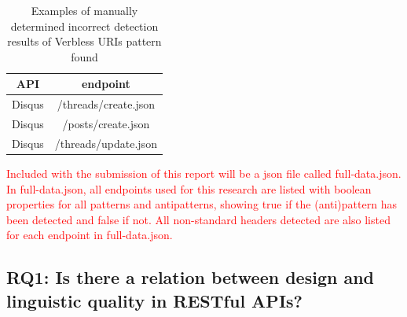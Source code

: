 \begin{table}[]
    \centering
    \begin{tabular}{|c|c|} \hline
        API & endpoint \\ \hline
        Disqus & /threads/create.json \\ \hline
        Disqus & /posts/create.json \\ \hline
        Disqus & /threads/update.json \\ \hline
    \end{tabular}
    \caption{Examples of manually determined incorrect detection results of Verbless URIs pattern found}
    \label{tab:Examples of manually determined incorrect detection results of Verbless URIs pattern found}
\end{table}

\textcolor{red}{Included with the submission of this report will be a json file called full-data.json. In full-data.json, all endpoints used for this research are listed with boolean properties for all patterns and antipatterns, showing true if the (anti)pattern has been detected and false if not. All non-standard headers detected are also listed for each endpoint in full-data.json.}

\clearpage

\subsection{RQ1: Is there a relation between design and linguistic quality in RESTful APIs?} \label{overallstats}

